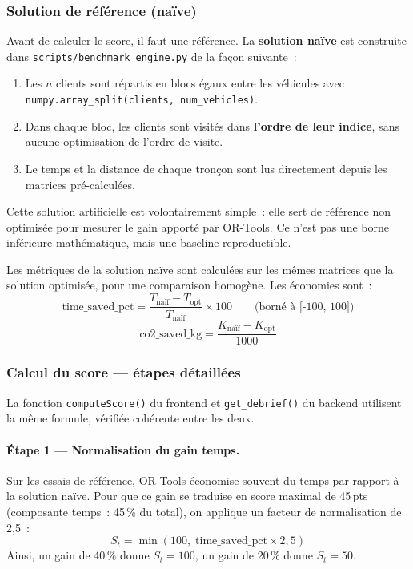 \documentclass[a4paper, 12pt, twoside]{article}
\begin{document}
\subsubsection{Solution de r\'{e}f\'{e}rence (na\"ive)}

Avant de calculer le score, il faut une r\'{e}f\'{e}rence. La \textbf{solution na\"ive} est
construite dans \texttt{scripts/benchmark\_engine.py} de la fa\c{c}on suivante~:
\begin{enumerate}
  \item Les $n$ clients sont r\'{e}partis en blocs \'{e}gaux entre les v\'{e}hicules avec
        \texttt{numpy.array\_split(clients, num\_vehicles)}.
  \item Dans chaque bloc, les clients sont visit\'{e}s dans \textbf{l'ordre de leur indice},
        sans aucune optimisation de l'ordre de visite.
  \item Le temps et la distance de chaque tron\c{c}on sont lus directement depuis les
        matrices pr\'{e}-calcul\'{e}es.
\end{enumerate}

Cette solution artificielle est volontairement simple~: elle sert de r\'{e}f\'{e}rence
non optimis\'{e}e pour mesurer le gain apport\'{e} par OR-Tools. Ce n'est pas une borne
inf\'{e}rieure math\'{e}matique, mais une baseline reproductible.

Les m\'{e}triques de la solution na\"ive sont calcul\'{e}es sur les m\^{e}mes matrices que
la solution optimis\'{e}e, pour une comparaison homog\`{e}ne. Les \'{e}conomies sont~:
\[
  \text{time\_saved\_pct} = \frac{T_{\text{na\"if}} - T_{\text{opt}}}{T_{\text{na\"if}}} \times 100
  \qquad \text{(born\'{e} \`{a} [-100, 100])}
\]
\[
  \text{co2\_saved\_kg} = \frac{K_{\text{na\"if}} - K_{\text{opt}}}{1000}
\]

\subsubsection{Calcul du score --- \'{e}tapes d\'{e}taill\'{e}es}

La fonction \texttt{computeScore()} du frontend et \texttt{get\_debrief()} du backend
utilisent la m\^{e}me formule, v\'{e}rifi\'{e}e coh\'{e}rente entre les deux.

\paragraph{\'Etape 1 --- Normalisation du gain temps.}
Sur les essais de r\'{e}f\'{e}rence, OR-Tools \'{e}conomise souvent du temps par rapport
\`{a} la solution na\"ive.
Pour que ce gain se traduise en score maximal de 45\,pts (composante temps~: 45\,\% du total),
on applique un facteur de normalisation de 2,5~:
\[
  S_t = \min\!\left(100,\; \text{time\_saved\_pct} \times 2{,}5\right)
\]
Ainsi, un gain de 40\,\% donne $S_t = 100$, un gain de 20\,\% donne $S_t = 50$.
\end{document}
